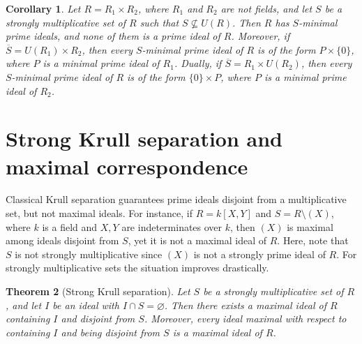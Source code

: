 \documentclass[11pt]{amsart}
\newtheorem{theorem}{Theorem}[section]
\newtheorem{corollary}[theorem]{Corollary}
\theoremstyle{definition}
\theoremstyle{remark}
\begin{document}
\begin{corollary}
Let $R=R_1\times R_2$, where $R_1$ and $R_2$ are not fields, and let $S$ be a strongly multiplicative set of $R$ such that $S\not\subseteq U(R)$. Then $R$ has $S$-minimal prime ideals, and none of them is a prime ideal of $R$. Moreover, if $\overline{S}=U(R_1)\times R_2$, then every $S$-minimal prime ideal of $R$ is of the form $P\times \{0\}$, where $P$ is a minimal prime ideal of $R_1$. Dually, if $\overline{S}=R_1\times U(R_2)$, then every $S$-minimal prime ideal of $R$ is of the form $\{0\}\times P$, where $P$ is a minimal prime ideal of $R_2$.
\end{corollary}

\section{Strong Krull separation and maximal correspondence}

Classical Krull separation guarantees prime ideals disjoint from a multiplicative set, but not maximal ideals.
For instance, if $R=k[X,Y]$ and $S=R\setminus (X)$, where $k$ is a field and $X,Y$ are indeterminates over $k$, then $(X)$ is maximal among ideals disjoint from $S$, yet it is not a maximal ideal of $R$. Here, note that $S$ is not strongly multiplicative since $(X)$ is not a strongly prime ideal of $R$. For strongly multiplicative sets the situation improves drastically.

\begin{theorem}[Strong Krull separation]\label{thm:strongkrull}
Let $S$ be a strongly multiplicative set of $R$, and let $I$ be an ideal with $I \cap S=\varnothing$.
Then there exists a maximal ideal of $R$ containing $I$ and disjoint from $S$.
Moreover, every ideal maximal with respect to containing $I$ and being disjoint from $S$ is a maximal ideal of $R$.
\end{theorem}
\end{document}
